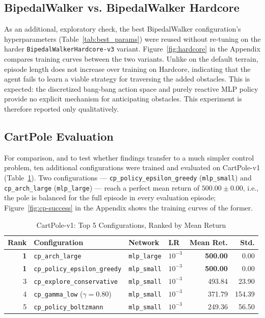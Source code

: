 \subsection{BipedalWalker vs. BipedalWalker Hardcore}

As an additional, exploratory check, the best BipedalWalker configuration's hyperparameters (Table~\ref{tab:best_params}) were reused without re-tuning on the harder \texttt{BipedalWalkerHardcore-v3} variant. Figure~\ref{fig:hardcore} in the Appendix compares training curves between the two variants. Unlike on the default terrain, episode length does not increase over training on Hardcore, indicating that the agent fails to learn a viable strategy for traversing the added obstacles. This is expected: the discretized bang-bang action space and purely reactive MLP policy provide no explicit mechanism for anticipating obstacles. This experiment is therefore reported only qualitatively.

\subsection{CartPole Evaluation}
For comparison, and to test whether findings transfer to a much simpler control problem, ten additional configurations were trained and evaluated on CartPole-v1 (Table~\ref{tab:cartpole-ranking}). Two configurations — \texttt{cp\_policy\_epsilon\_greedy} (\texttt{mlp\_small}) and \texttt{cp\_arch\_large} (\texttt{mlp\_large}) — reach a perfect mean return of $500.00 \pm 0.00$, i.e., the pole is balanced for the full episode in every evaluation episode; Figure~\ref{fig:cp-success} in the Appendix shows the training curves of the former.

\begin{table}[!ht]
    \centering
    \footnotesize
    \caption{CartPole-v1: Top 5 Configurations, Ranked by Mean Return}
    \label{tab:cartpole-ranking}
    \begin{tabular}{rlllrr}
        \toprule
        Rank & Configuration & Network & LR & Mean Ret. & Std. \\
        \midrule
        \textbf{1} & \texttt{cp\_arch\_large} & \texttt{mlp\_large} & $10^{-3}$ & \textbf{500.00} & 0.00 \\
        \textbf{1} & \texttt{cp\_policy\_epsilon\_greedy} & \texttt{mlp\_small} & $10^{-3}$ & \textbf{500.00} & 0.00 \\
        3 & \texttt{cp\_explore\_conservative} & \texttt{mlp\_small} & $10^{-3}$ & 493.84 & 23.90 \\
        4 & \texttt{cp\_gamma\_low} ($\gamma=0.80$) & \texttt{mlp\_small} & $10^{-3}$ & 371.79 & 154.39 \\
        5 & \texttt{cp\_policy\_boltzmann} & \texttt{mlp\_small} & $10^{-3}$ & 249.36 & 56.50 \\
        \bottomrule
    \end{tabular}
\end{table}

